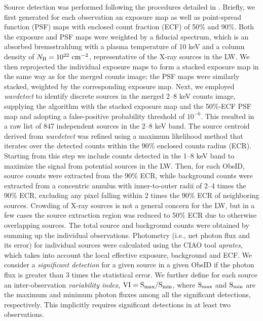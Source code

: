 \documentclass[fleqn,usenatbib]{mnras}
\begin{document}
Source detection was performed following the procedures detailed in \citet{2018ApJS..235...26Z}.
Briefly, we first generated for each observation an exposure map as well as point-spread function (PSF) maps with enclosed count fraction (ECF) of 50\% and 90\%. 
Both the exposure and PSF maps were weighted by a fiducial spectrum, which is an absorbed bremsstrahlung with a plasma temperature of 10 keV and a column density of $N_{\rm H}=10^{22}{\rm~cm^{-2}}$, representative of the X-ray sources in the LW. 
We then reprojected the individual exposure maps to form a stacked exposure map in the same way as for the merged counts image; the PSF maps were similarly stacked, weighted by the corresponding exposure map. 
Next, we employed {\it wavdetect} to identify discrete sources in the merged 2--8 keV counts image, supplying the algorithm with the stacked exposure map and the 50\%-ECF PSF map and adopting a false-positive probability threshold of $10^{-6}$. 
This resulted in a raw list of 847 independent sources in the 2--8 keV band. 
The source centroid derived from {\it wavdetect} was refined using a maximum likelihood method that iterates over the detected counts within the 90\% enclosed counts radius (ECR).
Starting from this step we include counts detected in the 1--8 keV band to maximize the signal from potential sources in the LW. 
Then, for each ObsID, source counts were extracted from the 90\% ECR, while background counts were extracted from a concentric annulus with inner-to-outer radii of 2--4 times the 90\% ECR, excluding any pixel falling within 2 times the 90\% ECR of neighboring sources.
Crowding of X-ray sources is not a general concern for the LW, but in a few cases the source extraction region was reduced to 50\% ECR due to otherwise overlapping sources. 
The total source and background counts were obtained by summing up the individual observations. 
Photometry (i.e., net photon flux and its error) for individual sources were calculated using the CIAO tool \emph{aprates}, which takes into account the local effective exposure, background and ECF. 
We consider a {\it significant detection} for a given source in a given ObsID if the photon flux is greater than 3 times the statistical error. 
We further define for each source an inter-observation {\it variability index}, $\rm VI=S_{max}/S_{min}$, where $\rm S_{max}$ and $\rm S_{min}$ are the maximum and minimum photon fluxes among all the significant detections, respectively. This implicitly requires significant detections in at least two observations.
\end{document}
